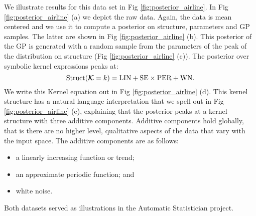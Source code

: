 We illustrate results for this data set in Fig \ref{fig:posterior_airline}. In Fig \ref{fig:posterior_airline} (a) we depict the raw data. 
Again, the data is mean centered and we use it to 
compute a posterior on structure, parameters and \ac{GP}
samples.
The latter are shown in  Fig \ref{fig:posterior_airline} (b).
This posterior of the \ac{GP} is generated with a random sample from the parameters
of the peak of the distribution on structure (Fig \ref{fig:posterior_airline} (c)).
The posterior over symbolic kernel expressions peaks at:
\begin{equation}
\text{Struct}(\bm{\mathcal{K}} = k )=\text{LIN} +  \text{SE} \times \text{PER}+ \text{WN}.
\end{equation}
We write this Kernel equation out in Fig \ref{fig:posterior_airline} (d).
This kernel structure has a natural language interpretation that we spell out in
Fig \ref{fig:posterior_airline} (e), explaining that 
the posterior peaks at a kernel structure with three additive components.
Additive components hold globally, that is there are no higher level, qualitative aspects
of the data that vary with the input space.
The additive components are as follows: 
\begin{itemize}
\item a linearly increasing function or trend;
\item an approximate periodic function; and
\item  white noise.
\end{itemize}
Both datasets served as illustrations in the Automatic Statistician project.



